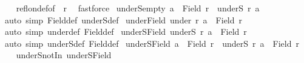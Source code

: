 \begin{isabellebody}
\ \ \isamarkupfalse%
\ refl{\isacharunderscore}{\kern0pt}on{\isacharunderscore}{\kern0pt}def{\isacharbrackleft}{\kern0pt}of\ {\isacharunderscore}{\kern0pt}\ r{\isacharbrackright}{\kern0pt}\ \isamarkupfalse%
\ fastforce%
\endisatagproof
{\isafoldproof}%
%
\isadelimproof
\isanewline
%
\endisadelimproof
\isanewline
{}\isamarkupfalse%
\ underS{\isacharunderscore}{\kern0pt}empty{\isacharcolon}{\kern0pt}\ {\isachardoublequoteopen}a\ {\isasymnotin}\ Field\ r\ {\isasymLongrightarrow}\ underS\ r\ a\ {\isacharequal}{\kern0pt}\ {\isacharbraceleft}{\kern0pt}{\isacharbraceright}{\kern0pt}{\isachardoublequoteclose}\isanewline
%
\isadelimproof
\ \ %
\endisadelimproof
%
\isatagproof
{}\isamarkupfalse%
\ {\isacharparenleft}{\kern0pt}auto\ simp{\isacharcolon}{\kern0pt}\ Field{\isacharunderscore}{\kern0pt}def\ underS{\isacharunderscore}{\kern0pt}def{\isacharparenright}{\kern0pt}%
\endisatagproof
{\isafoldproof}%
%
\isadelimproof
\isanewline
%
\endisadelimproof
\isanewline
{}\isamarkupfalse%
\ under{\isacharunderscore}{\kern0pt}Field{\isacharcolon}{\kern0pt}\ {\isachardoublequoteopen}under\ r\ a\ {\isasymsubseteq}\ Field\ r{\isachardoublequoteclose}\isanewline
%
\isadelimproof
\ \ %
\endisadelimproof
%
\isatagproof
{}\isamarkupfalse%
\ {\isacharparenleft}{\kern0pt}auto\ simp{\isacharcolon}{\kern0pt}\ under{\isacharunderscore}{\kern0pt}def\ Field{\isacharunderscore}{\kern0pt}def{\isacharparenright}{\kern0pt}%
\endisatagproof
{\isafoldproof}%
%
\isadelimproof
\isanewline
%
\endisadelimproof
\isanewline
{}\isamarkupfalse%
\ underS{\isacharunderscore}{\kern0pt}Field{\isacharcolon}{\kern0pt}\ {\isachardoublequoteopen}underS\ r\ a\ {\isasymsubseteq}\ Field\ r{\isachardoublequoteclose}\isanewline
%
\isadelimproof
\ \ %
\endisadelimproof
%
\isatagproof
{}\isamarkupfalse%
\ {\isacharparenleft}{\kern0pt}auto\ simp{\isacharcolon}{\kern0pt}\ underS{\isacharunderscore}{\kern0pt}def\ Field{\isacharunderscore}{\kern0pt}def{\isacharparenright}{\kern0pt}%
\endisatagproof
{\isafoldproof}%
%
\isadelimproof
\isanewline
%
\endisadelimproof
\isanewline
{}\isamarkupfalse%
\ underS{\isacharunderscore}{\kern0pt}Field{}{\isacharcolon}{\kern0pt}\ {\isachardoublequoteopen}a\ {\isasymin}\ Field\ r\ {\isasymLongrightarrow}\ underS\ r\ a\ {\isasymsubset}\ Field\ r{\isachardoublequoteclose}\isanewline
%
\isadelimproof
\ \ %
\endisadelimproof
%
\isatagproof
{}\isamarkupfalse%
\ underS{\isacharunderscore}{\kern0pt}notIn\ underS{\isacharunderscore}{\kern0pt}Field\ \isamarkupfalse%

\end{isabellebody}
